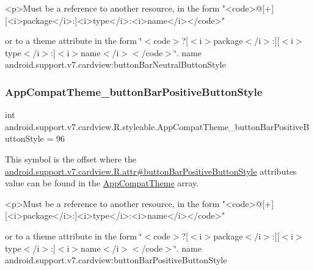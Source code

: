 \begin{DoxyVerb}      <p>Must be a reference to another resource, in the form "<code>@[+][<i>package</i>:]<i>type</i>:<i>name</i></code>"
\end{DoxyVerb}
 or to a theme attribute in the form \char`\"{}$<$code$>$?\mbox{[}$<$i$>$package$<$/i$>$\+:\mbox{]}\mbox{[}$<$i$>$type$<$/i$>$\+:\mbox{]}$<$i$>$name$<$/i$>$$<$/code$>$\char`\"{}.  name android.\+support.\+v7.\+cardview\+:button\+Bar\+Neutral\+Button\+Style \mbox{\label{classandroid_1_1support_1_1v7_1_1cardview_1_1R_1_1styleable_abfba42dac502deb993340e486ec71e30}} 
\subsubsection{\texorpdfstring{App\+Compat\+Theme\+\_\+button\+Bar\+Positive\+Button\+Style}{AppCompatTheme\_buttonBarPositiveButtonStyle}}
{\footnotesize\ttfamily int android.\+support.\+v7.\+cardview.\+R.\+styleable.\+App\+Compat\+Theme\+\_\+button\+Bar\+Positive\+Button\+Style = 96\hspace{0.3cm}{\ttfamily [static]}}

This symbol is the offset where the \hyperlink{classandroid_1_1support_1_1v7_1_1cardview_1_1R_1_1attr_a1de975827f0146bb24d27f277bfabeef}{android.\+support.\+v7.\+cardview.\+R.\+attr\#button\+Bar\+Positive\+Button\+Style} attribute\textquotesingle{}s value can be found in the \hyperlink{classandroid_1_1support_1_1v7_1_1cardview_1_1R_1_1styleable_a52e6f69f954ecc2622d72c0b4d298938}{App\+Compat\+Theme} array.

\begin{DoxyVerb}      <p>Must be a reference to another resource, in the form "<code>@[+][<i>package</i>:]<i>type</i>:<i>name</i></code>"
\end{DoxyVerb}
 or to a theme attribute in the form \char`\"{}$<$code$>$?\mbox{[}$<$i$>$package$<$/i$>$\+:\mbox{]}\mbox{[}$<$i$>$type$<$/i$>$\+:\mbox{]}$<$i$>$name$<$/i$>$$<$/code$>$\char`\"{}.  name android.\+support.\+v7.\+cardview\+:button\+Bar\+Positive\+Button\+Style \mbox{\label{classandroid_1_1support_1_1v7_1_1cardview_1_1R_1_1styleable_a79edaebda634ee0aecb95bc0b4d88a2b}} 
